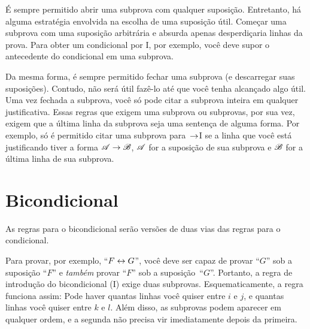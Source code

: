É sempre permitido abrir uma subprova com qualquer suposição. Entretanto, há alguma estratégia envolvida na escolha de uma suposição útil. Começar uma subprova com uma suposição arbitrária e absurda apenas desperdiçaria linhas da prova. Para obter um condicional por {\eif}I, por exemplo, você deve supor o antecedente do condicional em uma subprova.

Da mesma forma, é sempre permitido fechar uma subprova (e descarregar
suas suposições). Contudo, não será útil fazê-lo até que você tenha
alcançado algo útil. Uma vez fechada a subprova, você só pode citar
a subprova inteira em qualquer justificativa. Essas regras que
exigem uma subprova ou subprovas, por sua vez, exigem que a última linha
da subprova seja uma sentença de alguma forma. Por exemplo, só é
permitido citar uma subprova para~$\rightarrow$I se a linha que você está
justificando tiver a forma $\mathscr{A} \rightarrow \mathscr{B}$, $\mathscr{A}$ for
a suposição de sua subprova e $\mathscr{B}$ for a última linha de
sua subprova.


\section{Bicondicional}

As regras para o bicondicional serão versões de duas vias das regras
para o condicional.

Para provar, por exemplo, \textquotedblleft$F \leftrightarrow G$\textquotedblright{}, você deve ser capaz de
provar \textquotedblleft$G$\textquotedblright{} sob a suposição \textquotedblleft$F$\textquotedblright{} e \emph{também} provar \textquotedblleft$F$\textquotedblright{} sob a
suposição~\textquotedblleft$G$\textquotedblright{}. Portanto, a regra de introdução do bicondicional ({\eiff}I)
exige duas subprovas. Esquematicamente, a regra funciona assim:
Pode haver quantas linhas você quiser entre $i$ e $j$, e quantas linhas você quiser entre $k$ e $l$. Além disso, as subprovas podem aparecer em qualquer ordem, e a segunda não precisa vir imediatamente depois da primeira.

